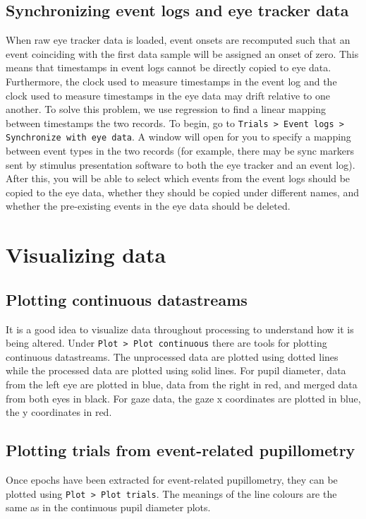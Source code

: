 \documentclass{article}
\begin{document}
\subsection{Synchronizing event logs and eye tracker data}
When raw eye tracker data is loaded, event onsets are recomputed such that an event coinciding with the first data sample will be assigned an onset of zero. This means that timestamps in event logs cannot be directly copied to eye data. Furthermore, the clock used to measure timestamps in the event log and the clock used to measure timestamps in the eye data may drift relative to one another. To solve this problem, we use regression to find a linear mapping between timestamps the two records. To begin, go to \texttt{Trials > Event logs > Synchronize with eye data}. A window will open for you to specify a mapping between event types in the two records (for example, there may be sync markers sent by stimulus presentation software to both the eye tracker and an event log). After this, you will be able to select which events from the event logs should be copied to the eye data, whether they should be copied under different names, and whether the pre-existing events in the eye data should be deleted.

\section{Visualizing data}
\subsection{Plotting continuous datastreams}
It is a good idea to visualize data throughout processing to understand how it is being altered. Under \texttt{Plot > Plot continuous} there are tools for plotting continuous datastreams. The unprocessed data are plotted using dotted lines while the processed data are plotted using solid lines. For pupil diameter, data from the left eye are plotted in blue, data from the right in red, and merged data from both eyes in black. For gaze data, the gaze x coordinates are plotted in blue, the y coordinates in red.

\subsection{Plotting trials from event-related pupillometry}
Once epochs have been extracted for event-related pupillometry, they can be plotted using \texttt{Plot > Plot trials}. The meanings of the line colours are the same as in the continuous pupil diameter plots.
\end{document}
